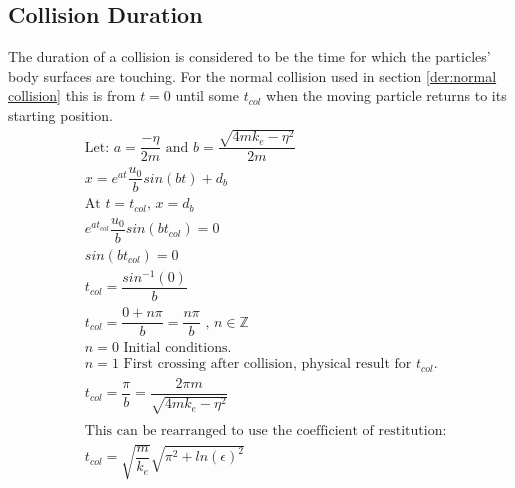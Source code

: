 \documentclass[a4paper,11pt,titlepage]{report}
\begin{document}
\subsection{Collision Duration}
\label{der:collision duration}
The duration of a collision is considered to be the time for which the particles' body surfaces are touching. For the normal collision used in section \ref{der:normal collision} this is from $t = 0$ until some $t_{col}$ when the moving particle returns to its starting position.
\begin{align*}
&\text{Let: } a = \dfrac{-\eta}{2m} \text{ and } b = \dfrac{\sqrt{4mk_e - \eta ^ 2}}{2m} \\
&x = e^{at} \dfrac{u_0}{b} sin(bt) + d_b \\
&\text{At $t = t_{col}$, $x = d_b$} \\
&e^{a t_{col}} \dfrac{u_0}{b} sin(b t_{col}) = 0 \\
&sin(bt_{col}) = 0 \\
&t_{col} = \dfrac{sin^{-1}(0)}{b} \\
&t_{col} = \dfrac{0 + n \pi}{b} = \dfrac{n \pi}{b} \text{ , } n \in \mathbb{Z} \\
&n = 0 \text{ Initial conditions.} \\
&n = 1 \text{ First crossing after collision, physical result for $t_{col}$.} \\
&t_{col} = \dfrac{\pi}{b} = \dfrac{2 \pi m}{\sqrt{4 m k_e - \eta ^ 2}} \\\\
&\text{This can be rearranged to use the coefficient of restitution:} \\
&t_{col} = \sqrt{\dfrac{m}{k_e}}\sqrt{\pi^2 + ln(\epsilon)^2}
\end{align*}
\end{document}
